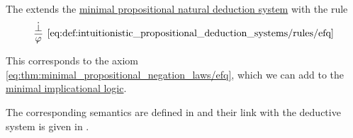 \begin{definition}\label{def:intuitionistic_propositional_deduction_systems}
  The  extends the \hyperref[def:minimal_propositional_natural_deduction_system]{minimal propositional natural deduction system} with the rule
  \begin{equation*}\taglabel[\logic{EFQ}]{eq:def:intuitionistic_propositional_deduction_systems/rules/efq}
    \begin{prooftree}
      \hypo{ \synbot }
      \infer1[\ref{eq:def:intuitionistic_propositional_deduction_systems/rules/efq}]{ \varphi }
    \end{prooftree}
  \end{equation*}
\end{definition}
\begin{comments}
  \item This corresponds to the axiom \eqref{eq:thm:minimal_propositional_negation_laws/efq}, which we can add to the \hyperref[def:minimal_implicational_logic]{minimal implicational logic}.
  \item The corresponding semantics are defined in  and their link with the deductive system is given in .
\end{comments}

